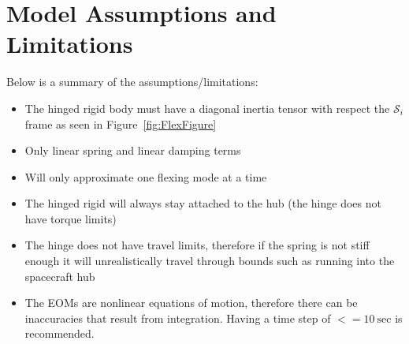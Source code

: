 \section{Model Assumptions and Limitations}
Below is a summary of the assumptions/limitations:

\begin{itemize}
	\item The hinged rigid body must have a diagonal inertia tensor with respect the $\mathcal{S}_i$ frame as seen in Figure~\ref{fig:FlexFigure}
	\item Only linear spring and linear damping terms
	\item Will only approximate one flexing mode at a time
	\item The hinged rigid will always stay attached to the hub (the hinge does not have torque limits)
	\item The hinge does not have travel limits, therefore if the spring is not stiff enough it will unrealistically travel through bounds such as running into the spacecraft hub
	\item The EOMs are nonlinear equations of motion, therefore there can be inaccuracies that result from integration. Having a time step of $<= 10\ \text{sec}$ is recommended. 
\end{itemize}